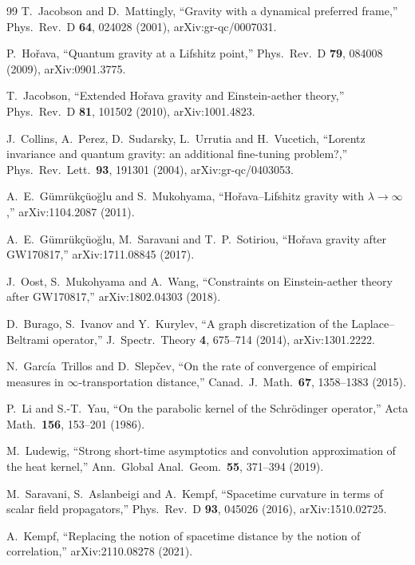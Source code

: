 \documentclass[11pt,a4paper]{article}
\theoremstyle{stmt}
\theoremstyle{defn}
\theoremstyle{rmk}
\numberwithin{equation}{section}
\begin{document}
{\begin{thebibliography}{99}
 T.~Jacobson and D.~Mattingly, ``Gravity with a dynamical preferred frame,'' Phys.\ Rev.\ D \textbf{64}, 024028 (2001), arXiv:gr-qc/0007031.

 P.~Ho\v{r}ava, ``Quantum gravity at a Lifshitz point,'' Phys.\ Rev.\ D \textbf{79}, 084008 (2009), arXiv:0901.3775.

 T.~Jacobson, ``Extended Ho\v{r}ava gravity and Einstein-aether theory,'' Phys.\ Rev.\ D \textbf{81}, 101502 (2010), arXiv:1001.4823.

 J.~Collins, A.~Perez, D.~Sudarsky, L.~Urrutia and H.~Vucetich, ``Lorentz invariance and quantum gravity: an additional fine-tuning problem?,'' Phys.\ Rev.\ Lett.\ \textbf{93}, 191301 (2004), arXiv:gr-qc/0403053.

 A.~E.~G\"umr\"uk\c{c}\"uo\u{g}lu and S.~Mukohyama, ``Ho\v{r}ava--Lifshitz gravity with $\lambda\to\infty$,'' arXiv:1104.2087 (2011).

 A.~E.~G\"umr\"uk\c{c}\"uo\u{g}lu, M.~Saravani and T.~P.~Sotiriou, ``Ho\v{r}ava gravity after GW170817,'' arXiv:1711.08845 (2017).

 J.~Oost, S.~Mukohyama and A.~Wang, ``Constraints on Einstein-aether theory after GW170817,'' arXiv:1802.04303 (2018).

 D.~Burago, S.~Ivanov and Y.~Kurylev, ``A graph discretization of the Laplace--Beltrami operator,'' J.\ Spectr.\ Theory \textbf{4}, 675--714 (2014), arXiv:1301.2222.

 N.~Garc\'ia~Trillos and D.~Slep\v{c}ev, ``On the rate of convergence of empirical measures in $\infty$-transportation distance,'' Canad.\ J.\ Math.\ \textbf{67}, 1358--1383 (2015).

 P.~Li and S.-T.~Yau, ``On the parabolic kernel of the Schr\"odinger operator,'' Acta Math.\ \textbf{156}, 153--201 (1986).

 M.~Ludewig, ``Strong short-time asymptotics and convolution approximation of the heat kernel,'' Ann.\ Global Anal.\ Geom.\ \textbf{55}, 371--394 (2019).

 M.~Saravani, S.~Aslanbeigi and A.~Kempf, ``Spacetime curvature in terms of scalar field propagators,'' Phys.\ Rev.\ D \textbf{93}, 045026 (2016), arXiv:1510.02725.

 A.~Kempf, ``Replacing the notion of spacetime distance by the notion of correlation,'' arXiv:2110.08278 (2021).


\end{thebibliography}}
\end{document}
